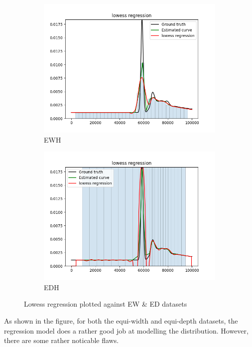 \documentclass[letterpaper,12pt]{article}
\begin{document}
\begin{figure}[H]
\begin{subfigure}[h]{0.5\linewidth}
\includegraphics[width=\linewidth]{lowess_ewh_graph}
\caption{EWH}
\end{subfigure}
\hfill
\begin{subfigure}[h]{0.5\linewidth}
\includegraphics[width=\linewidth]{lowess_edh_graph}
\caption{EDH}
\end{subfigure}
\caption{Lowess regression plotted against EW \& ED datasets}
\end{figure}
As shown in the figure, for both the equi-width and equi-depth datasets, the regression model does
a rather good job at modelling the distribution. However, there are some rather noticable flaws.
\end{document}
